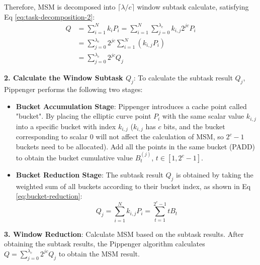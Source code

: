 \documentclass[conference]{IEEEtran}
\begin{document}
Therefore, MSM is decomposed into $\lceil \lambda / c \rceil$ window subtask calculate, satisfying Eq \eqref{eq:task-decomposition-2}:
\begin{equation}
\begin{aligned}
\label{eq:task-decomposition-2}
Q &= \sum_{i=1}^N k_i P_i = \sum_{i=1}^N \sum_{j=0}^{\lambda_c} k_{i,j} 2^{j c} P_i \\
&= \sum_{j=0}^{\lambda_c} 2^{j c} \sum_{i=1}^N (k_{i,j} P_i) \\
&= \sum_{j=0}^{\lambda_c} 2^{j c} Q_j
\end{aligned}
\end{equation}

\textbf{2. Calculate the Window Subtask $Q_j$}: To calculate the subtask result $Q_j$, Pippenger performs the following two stages:
\begin{itemize}
\item \textbf{Bucket Accumulation Stage}: Pippenger introduces a cache point called "bucket". By placing the elliptic curve point $P_i$ with the same scalar value $k_{i,j}$ into a specific bucket with index $k_{i,j}$ ($k_{i,j}$ has $c$ bits, and the bucket corresponding to scalar 0 will not affect the calculation of MSM, so $2^c - 1$ buckets need to be allocated). Add all the points in the same bucket (PADD) to obtain the bucket cumulative value $B_t^{(j)}$, $t \in [1, 2^c - 1]$.
\item \textbf{Bucket Reduction Stage}: The subtask result $Q_j$ is obtained by taking the weighted sum of all buckets according to their bucket index, as shown in Eq \eqref{eq:bucket-reduction}:
\begin{equation}
\label{eq:bucket-reduction}
Q_j = \sum_{i=1}^N k_{i,j} P_i = \sum_{t=1}^{2^c - 1} t B_t
\end{equation}
\end{itemize}

\textbf{3. Window Reduction}: Calculate MSM based on the subtask results. After obtaining the subtask results, the Pippenger algorithm calculates $Q = \sum_{j=0}^{\lambda_c} 2^{j c} Q_j$ to obtain the MSM result.

\end{document}
